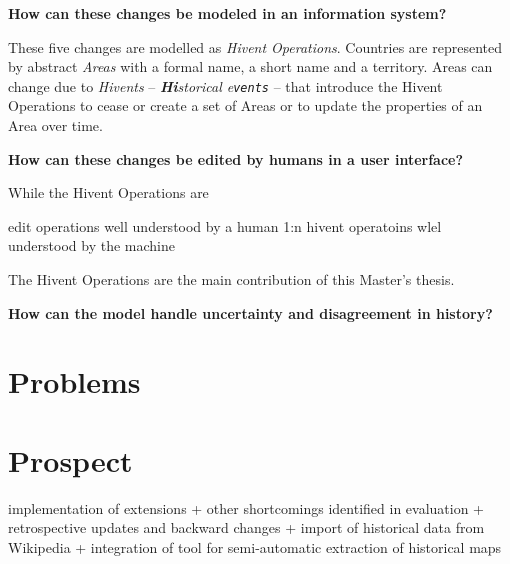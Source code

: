 \begin{description}[labelindent=0.1em]
  \item[\textbf{2a)}]
  \textbf{
    How can these changes be modeled in an information system?
  }
\end{description}


These five changes are modelled as \emph{Hivent Operations}. Countries are represented by abstract \emph{Areas} with a formal name, a short name and a territory. Areas can change due to \emph{Hivents} -- \emph{\textbf{Hi}storical e\texttt{vents}} -- that introduce the Hivent Operations to cease or create a set of Areas or to update the properties of an Area over time.


\begin{description}[labelindent=0.1em]
  \item[\textbf{2b)}]
  \textbf{
    How can these changes be edited by humans in a user interface?
  }
\end{description}

While the Hivent Operations are


edit operations well understood by a human
1:n
hivent operatoins wlel understood by the machine


The Hivent Operations are the main contribution of this Master's thesis.

\begin{description}[labelindent=0.55em]
  \item[\textbf{3)}]
  \textbf{
    How can the model handle uncertainty and disagreement in history?
  }
\end{description}



\section{Problems} %
\label{sec:problems}




\section{Prospect} %
\label{sec:prospect}


implementation of extensions
+ other shortcomings identified in evaluation
+ retrospective updates and backward changes
+ import of historical data from Wikipedia
+ integration of tool for semi-automatic extraction of historical maps

